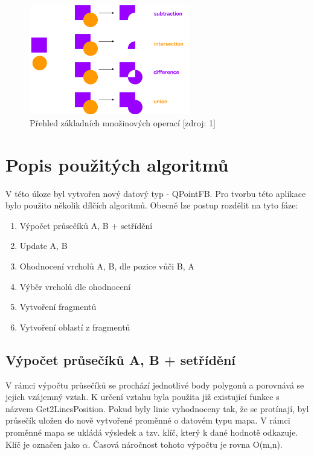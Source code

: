 \documentclass[a4paper, 12pt]{article}
\begin{document}
\begin{figure}[h!]
	\centering
	\includegraphics[width=7cm]{pictures/operace.png}
	\caption{Přehled základních množinových operací [zdroj: 1]}
\end{figure}

\section{Popis použitých algoritmů}
V této úloze byl vytvořen nový datový typ - QPointFB. Pro tvorbu této aplikace bylo použito několik dílčích algoritmů. Obecně lze postup rozdělit na tyto fáze:

\begin{enumerate}
\item Výpočet průsečíků A, B + setřídění
\item Update A, B
\item Ohodnocení vrcholů A, B, dle pozice vůči B, A
\item Výběr vrcholů dle ohodnocení
\item Vytvoření fragmentů
\item Vytvoření oblastí z fragmentů
\end{enumerate}

\subsection{Výpočet průsečíků A, B + setřídění}
V rámci výpočtu průsečíků se prochází jednotlivé body polygonů a porovnává se jejich vzájemný vztah. K určení vztahu byla použita již existující funkce s názvem Get2LinesPosition. Pokud byly linie vyhodnoceny tak, že se protínají, byl průsečík uložen do nově vytvořené proměnné o datovém typu mapa. V rámci proměnné mapa se ukládá výsledek a tzv. klíč, který k dané hodnotě odkazuje. Klíč je označen jako $\alpha$. Časová náročnost tohoto výpočtu je rovna O(m,n).
\end{document}
